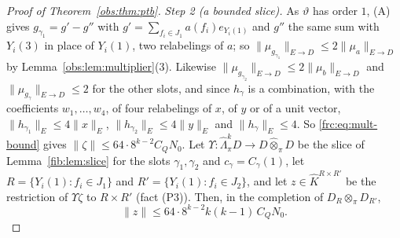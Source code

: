 \documentclass[11pt]{amsart}
\theoremstyle{definition}
\theoremstyle{remark}
\numberwithin{equation}{section}
\newcommand{\norm}[1]{\lVert #1\rVert}
\newcommand{\Kh}{\widehat K}
\theoremstyle{plain}
\theoremstyle{definition}
\theoremstyle{plain}
\begin{document}
\begin{proof}[Proof of Theorem~\ref{obs:thm:ptb}]
\emph{Step 2 (a bounded slice).} As $\vartheta$ has order $1$, (A) gives $g_{\gamma_1}=g'-g''$ with
$g'=\sum_{f_i\in J_1}a(f_i)e_{Y_i(1)}$ and $g''$ the same sum with $Y_i(3)$ in place of $Y_i(1)$, two relabelings of $a$;
so $\norm{\mu_{g_{\gamma_1}}}_{E\to D}\le2\norm{\mu_a}_{E\to D}$ by Lemma~\ref{obs:lem:multiplier}(3). Likewise
$\norm{\mu_{g_{\gamma_2}}}_{E\to D}\le2\norm{\mu_b}_{E\to D}$ and $\norm{\mu_{g_\gamma}}_{E\to D}\le2$ for the other slots,
and since $h_\gamma$ is a combination, with the coefficients $w_1,\dots,w_4$, of four relabelings of $x$, of $y$ or of a
unit vector,
$\norm{h_{\gamma_1}}_E\le4\norm x_E$, $\norm{h_{\gamma_2}}_E\le4\norm y_E$ and $\norm{h_\gamma}_E\le4$. So
\eqref{frc:eq:mult-bound} gives $\norm\zeta\le64\cdot8^{k-2}C_QN_0$. Let $\Upsilon\colon\widehat\Lambda^k_\pi D\to
D\widehat\otimes_\pi D$ be the slice of Lemma~\ref{fib:lem:slice} for the slots $\gamma_1,\gamma_2$ and
$c_\gamma=C_\gamma(1)$, let $R=\{Y_i(1):f_i\in J_1\}$ and $R'=\{Y_i(1):f_i\in J_2\}$, and let $z\in\Kh^{R\times R'}$ be the
restriction of $\Upsilon\zeta$ to $R\times R'$ (fact (P3)). Then, in the completion of $D_R\otimes_\pi D_{R'}$,
\begin{equation}\label{frc:eq:slice}
 \norm z\le64\cdot8^{k-2}k(k-1)\,C_QN_0 .
\end{equation}


\end{proof}
\end{document}
